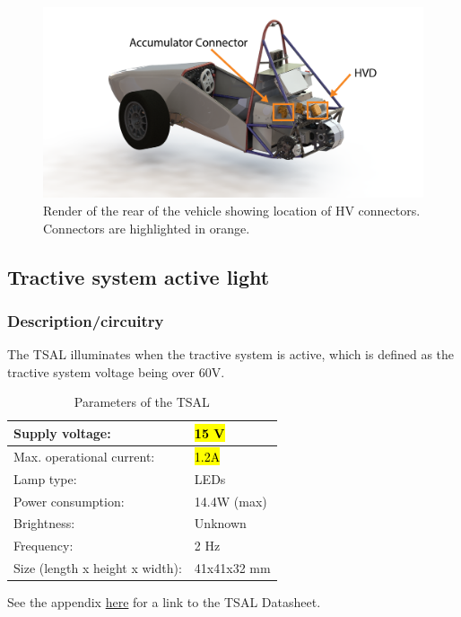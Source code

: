 \documentclass{article}
\begin{document}
\begin{figure}[H]
\centering
\includegraphics[width = .75\textwidth]{TS_interlock_location}
\caption{Render of the rear of the vehicle showing location of HV connectors. Connectors are highlighted in orange. }
\label{fig:rear_of_car}
\end{figure}

\subsection{Tractive system active light}\label{tractive_system_active_light}
\subsubsection{Description/circuitry}
The TSAL illuminates when the tractive system is active, which is defined as the tractive system voltage being over 60V.

	\begin{table}[H]
	    \centering
	    \begin{tabular}{|l|l|}
	    \hline
	    Supply voltage: & \hl{15 V} \\ \hline
	    Max. operational current: &  \hl{1.2A}\\ \hline
	    Lamp type: & LEDs \\ \hline
	    Power consumption: & 14.4W (max)\\ \hline
	    Brightness: & Unknown\\ \hline
	    Frequency: & 2 Hz \\ \hline
	    Size (length x height x width): & 41x41x32 mm \\ \hline
	    \end{tabular}
	    \caption{Parameters of the TSAL}
	    \label{TSALparameters}
	\end{table}
	
See the appendix \hyperlink{TSALdatasheet}{here} for a link to the TSAL Datasheet.
\end{document}
